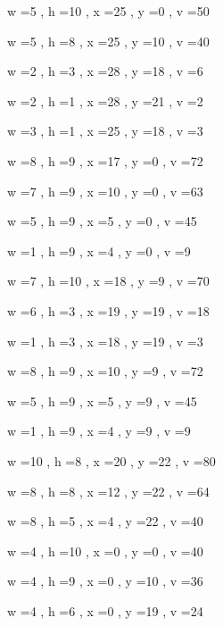 \documentclass[11pt]{article}
\begin{document}
w =5 , h =10 , x =25 , y =0 , v =50
\par
w =5 , h =8 , x =25 , y =10 , v =40
\par
w =2 , h =3 , x =28 , y =18 , v =6
\par
w =2 , h =1 , x =28 , y =21 , v =2
\par
w =3 , h =1 , x =25 , y =18 , v =3
\par
w =8 , h =9 , x =17 , y =0 , v =72
\par
w =7 , h =9 , x =10 , y =0 , v =63
\par
w =5 , h =9 , x =5 , y =0 , v =45
\par
w =1 , h =9 , x =4 , y =0 , v =9
\par
w =7 , h =10 , x =18 , y =9 , v =70
\par
w =6 , h =3 , x =19 , y =19 , v =18
\par
w =1 , h =3 , x =18 , y =19 , v =3
\par
w =8 , h =9 , x =10 , y =9 , v =72
\par
w =5 , h =9 , x =5 , y =9 , v =45
\par
w =1 , h =9 , x =4 , y =9 , v =9
\par
w =10 , h =8 , x =20 , y =22 , v =80
\par
w =8 , h =8 , x =12 , y =22 , v =64
\par
w =8 , h =5 , x =4 , y =22 , v =40
\par
w =4 , h =10 , x =0 , y =0 , v =40
\par
w =4 , h =9 , x =0 , y =10 , v =36
\par
w =4 , h =6 , x =0 , y =19 , v =24
\par
\newpage


\end{document}
